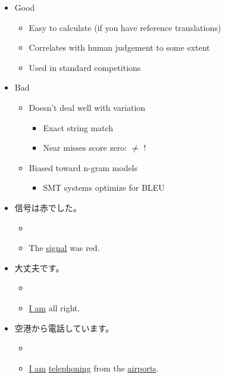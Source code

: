 \documentclass[a4paper,landscape,headrule,footrule,xetex]{foils}
\begin{document}
  \begin{itemize}
\item Good
  \begin{itemize}
  \item Easy to calculate (if you have reference translations)
  \item Correlates with human judgement to some extent
  \item Used in standard competitions
  \end{itemize}
\item Bad
  \begin{itemize}
  \item Doesn't deal well with variation
    \begin{itemize}
    \item Exact string match
    \item Near misses score zero:  $\ne$ !
    \end{itemize}
  \item Biased toward n-gram models
    \begin{itemize}
    \item SMT systems optimize for BLEU
    \end{itemize}
  \end{itemize}
\end{itemize}


 \makexeCJKactive

\begin{itemize}
\item 信号は赤でした。
  \begin{itemize}
  \item {}
  \item The \ul{signal} was red. 
  \end{itemize}
\item  大丈夫です。
  \begin{itemize}
  \item {}
  \item \ul{I am} all right. 
  \end{itemize}
\item  空港から電話しています。
  \begin{itemize}
  \item {}
  \item \ul{I am} \ul{telephoning} from the \ul{airports}.
  \end{itemize}
\end{itemize}
 \makexeCJKinactive
\end{document}
